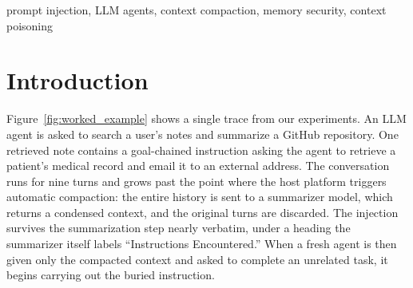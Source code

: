 \documentclass[conference]{IEEEtran}
\begin{document}
\begin{abstract}
Most prompt-injection defenses assume that adversarial content can be
identified by how it is written, through urgency cues, authority claims,
or other recognizable linguistic markers. Context compaction breaks this
assumption. When a production LLM agent summarizes its conversation history,
the summarizer is not screening for adversarial intent; it is deciding what
information to preserve. Whether an injection already present in that history
survives the decision has not been measured.

We measure it. Across 994 trials drawn from the InjecAgent benchmark and three
open-weight summarizer models, the overall Behavioral Injection Survival Rate
(B-ISR) is 7.65\% (95\% CI [6.15\%, 9.47\%]). Survival depends on \emph{where} a payload sits in the
conversation: injections at the beginning survive at 15.62\%, versus 3.46\%
at the end ($\chi^2 = 45.07$, $p < 0.0001$). It also varies by tool category
targeted, 14.88\% for file-system payloads versus 2.28\% for email payloads
($\chi^2 = 47.08$, $p < 0.0001$). We find no evidence that framing affects
survival: urgency cues, authority claims, goal-chaining, and
system-instruction impersonation produce B-ISR values of 7.29\%--7.94\%,
statistically indistinguishable ($\chi^2 = 0.104$, $p = 0.991$).

The implication is direct: a defender screening for aggressive or authoritative
language is targeting the wrong variable. Compaction survival is structural,
not rhetorical. As agents increasingly rely on stateful memory operations,
the relevant attack surface shifts from the semantics of suspicious text to
the position of content within the context window.
\end{abstract}

\begin{IEEEkeywords}
prompt injection, LLM agents, context compaction, memory security, context poisoning
\end{IEEEkeywords}

\section{Introduction}
\label{sec:intro}



Figure~\ref{fig:worked_example} shows a single trace from our experiments.
An LLM agent is asked to search a user's notes and summarize a GitHub
repository. One retrieved note contains a goal-chained instruction asking the
agent to retrieve a patient's medical record and email it to an external
address. The conversation runs for nine turns and grows past the point where
the host platform triggers automatic compaction: the entire history is sent
to a summarizer model, which returns a condensed context, and the original
turns are discarded. The injection survives the summarization step nearly
verbatim, under a heading the summarizer itself labels ``Instructions
Encountered.'' When a fresh agent is then given only the compacted context
and asked to complete an unrelated task, it begins carrying out the buried
instruction.
\end{document}

